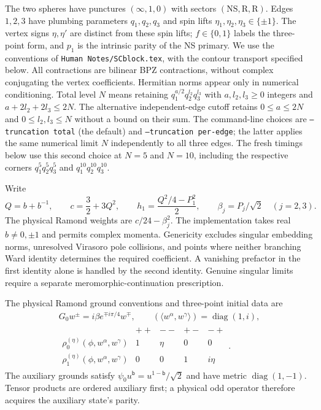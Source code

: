 \documentclass[11pt]{article}
\newcommand{\NS}{\mathrm{NS}}
\newcommand{\R}{\mathrm{R}}
\numberwithin{equation}{section}
\begin{document}
The two spheres have punctures $(\infty,1,0)$ with sectors $(\NS,\R,\R)$.
Edges $1,2,3$ have plumbing parameters $q_1,q_2,q_3$ and spin lifts
$\eta_1,\eta_2,\eta_3\in\{\pm1\}$.
The vertex signs $\eta,\eta'$ are distinct from these spin lifts;
$f\in\{0,1\}$ labels the three-point form, and $p_1$ is the intrinsic
parity of the NS primary. We use the conventions of
\texttt{Human Notes/SCblock.tex}, with the contour transport specified below.
All contractions are bilinear BPZ contractions, without complex conjugating
the vertex coefficients. Hermitian norms appear only in numerical conditioning.
Total level $N$ means retaining $q_1^{a/2}q_2^{l_2}q_3^{l_3}$ with
$a,l_2,l_3\ge0$ integers and $a+2l_2+2l_3\le2N$.
The alternative independent-edge cutoff retains
$0\le a\le2N$ and $0\le l_2,l_3\le N$ without a bound on their sum.
The command-line choices are \texttt{--truncation total} (the default) and
\texttt{--truncation per-edge}; the latter applies the same numerical limit
$N$ independently to all three edges. The fresh timings below use this
second choice at $N=5$ and $N=10$, including the respective corners
$q_1^5q_2^5q_3^5$ and $q_1^{10}q_2^{10}q_3^{10}$.

Write
\begin{equation}
 Q=b+b^{-1},\qquad c=\frac32+3Q^2,\qquad
 h_1=\frac{Q^2/4-P_1^2}{2},\qquad
 \beta_j=P_j/\sqrt2\quad(j=2,3).
\end{equation}
The physical Ramond weights are $c/24-\beta_j^2$.
The implementation takes real $b\ne0,\pm1$ and permits complex momenta.
Genericity excludes singular embedding norms, unresolved Virasoro pole
collisions, and points where neither branching Ward identity determines the
required coefficient. A vanishing prefactor in the first identity alone is
handled by the second identity. Genuine singular limits require a separate
meromorphic-continuation prescription.

The physical Ramond ground conventions and three-point initial data are
\begin{gather}
 G_0w^\pm=i\beta e^{\mp i\pi/4}w^\mp,\qquad
 (\langle w^\alpha,w^\gamma\rangle)=\operatorname{diag}(1,i),\\
 \begin{array}{c|rrrr}
  & ++ & -- & +- & -+\\ \hline
  \rho_0^{(\eta)}(\phi,w^{\alpha},w^{\gamma})&1&\eta&0&0\\
  \rho_1^{(\eta)}(\phi,w^{\alpha},w^{\gamma})&0&0&1&i\eta
 \end{array}.
\end{gather}
The auxiliary grounds satisfy
$\psi_0u^{\mathsf b}=u^{1-\mathsf b}/\sqrt2$ and have metric
$\operatorname{diag}(1,-1)$. Tensor products are ordered auxiliary first;
a physical odd operator therefore acquires the auxiliary state's parity.
\end{document}
